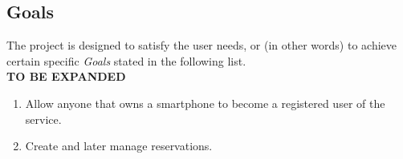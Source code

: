 \subsection{Goals}
The project is designed to satisfy the user needs, or (in other words) to achieve certain specific \emph{Goals} stated in the following list.\\
\textbf{TO BE EXPANDED}
\begin{enumerate}[label=Goal.\arabic*:]
\item Allow anyone that owns a smartphone to become a registered user of the service.
\item Create and later manage reservations.
\end{enumerate}
